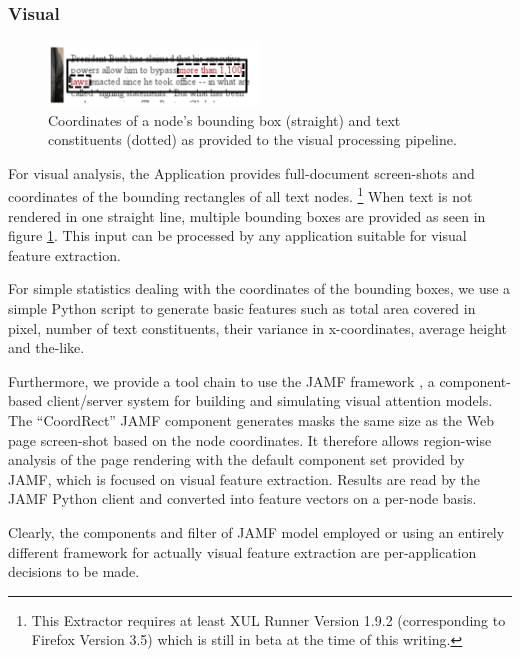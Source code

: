 \subsubsection{Visual}

\begin{figure}
\includegraphics[width=0.5\textwidth]{vizwrap}
\caption{\label{f:vizwrap}Coordinates of a node's bounding box (straight) and text constituents (dotted) as provided to the visual processing pipeline.}
\end{figure}

For visual analysis, the Application provides full-document screen-shots and coordinates of the bounding rectangles of all text nodes.%
\footnote{This Extractor requires at least XUL Runner Version 1.9.2 (corresponding to Firefox Version 3.5) which is still in beta at the time of this writing.}
When text is not rendered in one straight line, multiple bounding boxes are provided as seen in figure \ref{f:vizwrap}.
This input can be processed by any application suitable for visual feature extraction.

For simple statistics dealing with the coordinates of the bounding boxes, we use a simple Python script to generate basic features such as total area covered in pixel, number of text constituents, their variance in x-coordinates, average height and the-like.

Furthermore, we provide a tool chain to use the JAMF framework \cite{Steger08}, a component-based client/server system for building and simulating visual attention models.
The ``CoordRect'' JAMF component generates masks the same size as the Web page screen-shot based on the node coordinates.
It therefore allows region-wise analysis of the page rendering with the default component set provided by JAMF, which is focused on visual feature extraction.
Results are read by the JAMF Python client and converted into feature vectors on a per-node basis.

Clearly, the components and filter of JAMF model employed or using an entirely different framework for actually visual feature extraction are per-application decisions to be made.


